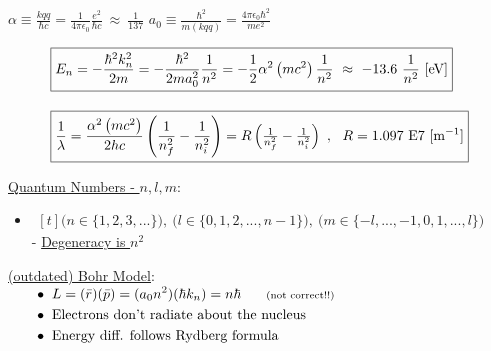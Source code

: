 \documentclass[12pt]{article}
\begin{document}
\vspace{25pt} \noindent
\( \boxed{ \alpha \equiv \frac{kqq}{\hbar c} 
    = \frac{1}{4 \pi \epsilon_0} \frac{e^2}{\hbar c} \ \approx \ \frac{1}{137} } \)
\hspace{1cm}
\( \boxed{ a_0 \equiv \frac{\hbar^2}{m (kqq)} = \frac{4 \pi \epsilon_0 \hbar^2}{m e^2} } \)

\begin{align*}
    \Aboxed{ &E_n = - \frac{\hbar^2 k_n^2}{2m} = - \frac{\hbar^2}{2m a_0^2} \frac{1}{n^2}
        = - \frac{1}{2} \alpha^2 \left( m c^2 \right) \dfrac{1}{n^2}
        \ \approx \ -13.6 \ \dfrac{1}{n^2} \ [\text{eV}] }\\[10pt]
    \Aboxed{ &\frac{1}{\lambda} = \frac{\alpha^2 \left( m c^2 \right) }{2 h c}
        \left( \dfrac{1}{n_f^2} - \dfrac{1}{n_i^2} \right)
        = R \left( \tfrac{1}{n_f^2} - \tfrac{1}{n_i^2} \right) 
        \ , \ \ R = 1.097 \ \text{E} 7 \ [\text{m}^{-1}] }
\end{align*}

\vspace{20pt} \noindent
\underline{Quantum Numbers - \(n,l,m\)}:
\begin{itemize}
\item \( \begin{gathered}[t]
        \Big( n \in \{ 1, 2, 3, ... \} \Big), \ 
        \Big( l \in \{ 0, 1, 2, ..., n-1 \} \Big), \
        \Big( m \in \{ -l, ..., -1, 0, 1, ..., l \} \Big)
    \end{gathered} \)\\[10pt]
    - \underline{Degeneracy is \(n^2\)}
\end{itemize}      

\vspace{10pt}\noindent
\underline{(outdated) Bohr Model}:\\[10pt]
\(\begin{aligned}
    \hspace{18pt} &\bullet \ L = ( \bar{r} ) ( \bar{p} ) = (a_0 n^2) (\hbar k_n) 
        = n\hbar \hspace{18pt} \text{\scriptsize(not correct!!)}\\
    \hspace{18pt} &\bullet \ \text{Electrons don't radiate about the nucleus}\\
    \hspace{18pt} &\bullet \ \text{Energy diff. follows Rydberg formula}
\end{aligned}\)
\end{document}
